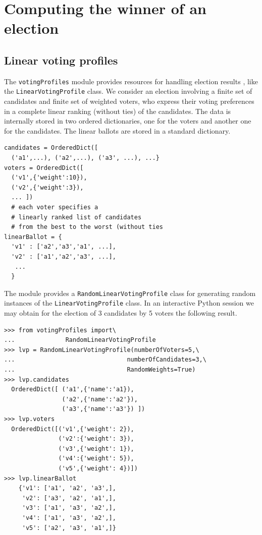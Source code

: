 \chapter{Computing the winner of an election}
\label{sec:7}

  

\section{Linear voting profiles}
\label{sec:7.1}

The {\tt votingProfiles} module provides resources for handling election results \citep{ADT-L2}, like the \texttt{LinearVotingProfile} class. We consider an election involving a finite set of candidates and finite set of weighted voters, who express their voting preferences in a complete linear ranking (without ties) of the candidates. The data is internally stored in two ordered dictionaries, one for the voters and another one for the candidates. The linear ballots are stored in a standard dictionary.
\begin{lstlisting}
candidates = OrderedDict([
  ('a1',...), ('a2',...), ('a3', ...), ...}
voters = OrderedDict([
  ('v1',{'weight':10}),
  ('v2',{'weight':3}),
  ... ])
  # each voter specifies a
  # linearly ranked list of candidates
  # from the best to the worst (without ties
linearBallot = {
  'v1' : ['a2','a3','a1', ...],
  'v2' : ['a1','a2','a3', ...],
   ...
  }
\end{lstlisting}

The module provides a \texttt{RandomLinearVotingProfile} class  for generating random instances of the \texttt{LinearVotingProfile} class. In an interactive Python session we may obtain for the election of 3 candidates by 5 voters the following result.
\begin{lstlisting}[caption={Example of random linear voting profile},label=list:7.1]
>>> from votingProfiles import\
...              RandomLinearVotingProfile
>>> lvp = RandomLinearVotingProfile(numberOfVoters=5,\
...                               numberOfCandidates=3,\
...                               RandomWeights=True) 
>>> lvp.candidates
  OrderedDict([ ('a1',{'name':'a1}),
                ('a2',{'name':'a2'}),
                ('a3',{'name':'a3'}) ])
>>> lvp.voters
  OrderedDict([('v1',{'weight': 2}),
               ('v2':{'weight': 3}), 
               ('v3',{'weight': 1}),
               ('v4':{'weight': 5}),
               ('v5',{'weight': 4})])
>>> lvp.linearBallot
    {'v1': ['a1', 'a2', 'a3',],
     'v2': ['a3', 'a2', 'a1',],
     'v3': ['a1', 'a3', 'a2',],
     'v4': ['a1', 'a3', 'a2',],
     'v5': ['a2', 'a3', 'a1',]} 
 \end{lstlisting}

